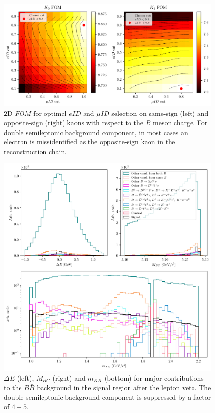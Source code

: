 \begin{figure}[H]
	\centering
	\captionsetup{width=0.8\linewidth}
	\includegraphics[width=\linewidth]{fig/lepVeto}
	\caption{2D $FOM$ for optimal $eID$ and $\mu ID$ selection on same-sign (left) and opposite-sign (right) kaons with respect to the $B$ meson charge. For double semileptonic background component, in most cases an electron is missidentified as the opposite-sign kaon in the reconstruction chain.}
	\label{fig:lepVeto}
\end{figure} 

\begin{figure}[H]
	\centering
	\captionsetup{width=0.8\linewidth}
	\includegraphics[width=\linewidth]{fig/sig_BKG_composition_all_after}
	\caption{$\Delta E$ (left), $M_{BC}$ (right) and $m_{KK}$ (bottom) for major contributions to the $B \bar B$ background in the signal region after the lepton veto. The double semileptonic background component is suppressed by a factor of $4-5$.}
	\label{fig:sig_bkg_all_after}
\end{figure} 

